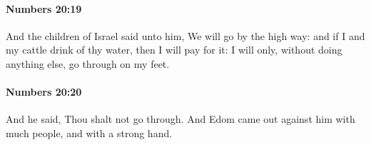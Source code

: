 		\paragraph{Numbers 20:19} %
			\label{NUMBERS-20-19}

			And the children of Israel said unto him, We will go by the high way: and if I and my cattle drink of thy water, then I will pay for it: I will only, without doing anything else, go through on my feet.


		\paragraph{Numbers 20:20} %
			\label{NUMBERS-20-20}

			And he said, Thou shalt not go through. And Edom came out against him with much people, and with a strong hand.


